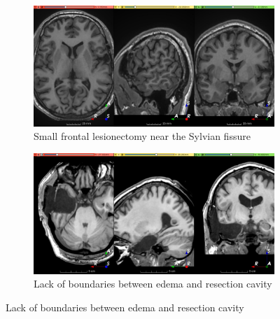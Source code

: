 \begin{figure}
  \begin{subfigure}{0.49\textwidth}
    \centering
    \includegraphics[width=\linewidth]{figures/hard_3}
    \caption{Small frontal lesionectomy near the Sylvian fissure}
    \label{fig:hard_sub_3}
  \end{subfigure}
  \hfill
  \begin{subfigure}{0.49\textwidth}
    \centering
    \includegraphics[width=\linewidth]{figures/hard_4}
    \caption{Lack of boundaries between edema and resection cavity}
    \label{fig:hard_sub_4}
  \end{subfigure}

  \bigskip


\end{figure}

